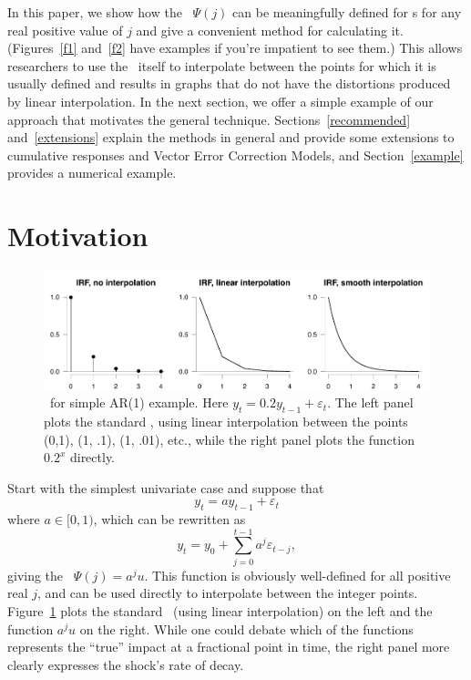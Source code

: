 \documentclass[12pt,fleqn]{article}
\newcommand{\vep}{\varepsilon}
\begin{document}
In this paper, we show how the \IRF\ $\Psi(j)$ can be meaningfully
defined for \VAR s for any real positive value of $j$ and give a
convenient method for calculating it. (Figures~\ref{f1} and~\ref{f2}
have examples if you're impatient to see them.) This allows
researchers to use the \VAR\ itself to interpolate between the points
for which it is usually defined and results in graphs that do not have
the distortions produced by linear interpolation. In the next section,
we offer a simple example of our approach that motivates the general
technique. Sections~\ref{recommended} and~\ref{extensions} explain the
methods in general and provide some extensions to cumulative responses
and Vector Error Correction Models, and Section~\ref{example} provides
a numerical example.

\section{Motivation}

\begin{figure}[t]
  \centering
  \includegraphics{graphs/motivation.pdf}
  \caption{\IRF\ for simple AR(1) example. Here $y_t = 0.2 y_{t-1} +
    \vep_t$. The left panel plots the standard \IRF, using linear
    interpolation between the points (0,1), (1, .1), (1, .01), etc.,
    while the right panel plots the function $0.2^x$ directly.}
  \label{f0}
\end{figure}

Start with the simplest univariate case and suppose that
\begin{equation}\label{eq:2}
y_t = a y_{t-1} + \vep_t
\end{equation}
where $a \in [0, 1)$, which can be rewritten as
\begin{equation}
  \label{eq:3}
  y_t = y_0 + \sum_{j=0}^{t-1} a^j \vep_{t-j},
\end{equation}
giving the \IRF\ $\Psi(j) = a^j u$. This function is obviously
well-defined for all positive real $j$, and can be used directly to
interpolate between the integer points. Figure~\ref{f0} plots the
standard \IRF\ (using linear interpolation) on the left and the
function $a^j u$ on the right. While one could debate which of the
functions represents the ``true'' impact at a fractional point in
time, the right panel more clearly expresses the shock's rate of
decay.
\end{document}
